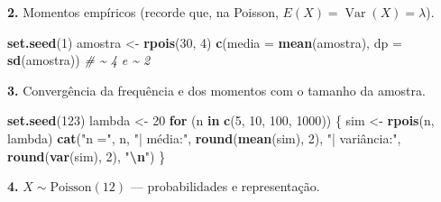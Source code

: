 \documentclass[
  portuguese,
  11pt,
  openany]{book}
\newenvironment{Shaded}{\begin{snugshade}}{\end{snugshade}}
\newcommand{\AttributeTok}[1]{\textcolor[rgb]{0.13,0.29,0.53}{#1}}
\newcommand{\CommentTok}[1]{\textcolor[rgb]{0.56,0.35,0.01}{\textit{#1}}}
\newcommand{\ControlFlowTok}[1]{\textcolor[rgb]{0.13,0.29,0.53}{\textbf{#1}}}
\newcommand{\DecValTok}[1]{\textcolor[rgb]{0.00,0.00,0.81}{#1}}
\newcommand{\FunctionTok}[1]{\textcolor[rgb]{0.13,0.29,0.53}{\textbf{#1}}}
\newcommand{\NormalTok}[1]{#1}
\newcommand{\OtherTok}[1]{\textcolor[rgb]{0.56,0.35,0.01}{#1}}
\newcommand{\SpecialCharTok}[1]{\textcolor[rgb]{0.81,0.36,0.00}{\textbf{#1}}}
\newcommand{\StringTok}[1]{\textcolor[rgb]{0.31,0.60,0.02}{#1}}
\begin{document}
\textbf{2.} Momentos empíricos (recorde que, na Poisson, \(E(X) = \operatorname{Var}(X) = \lambda\)).

\begin{Shaded}
\begin{Highlighting}[]
\FunctionTok{set.seed}\NormalTok{(}\DecValTok{1}\NormalTok{)}
\NormalTok{amostra }\OtherTok{\textless{}{-}} \FunctionTok{rpois}\NormalTok{(}\DecValTok{30}\NormalTok{, }\DecValTok{4}\NormalTok{)}
\FunctionTok{c}\NormalTok{(}\AttributeTok{media =} \FunctionTok{mean}\NormalTok{(amostra), }\AttributeTok{dp =} \FunctionTok{sd}\NormalTok{(amostra))   }\CommentTok{\# \textasciitilde{} 4 e \textasciitilde{} 2}
\end{Highlighting}
\end{Shaded}

\textbf{3.} Convergência da frequência e dos momentos com o tamanho da amostra.

\begin{Shaded}
\begin{Highlighting}[]
\FunctionTok{set.seed}\NormalTok{(}\DecValTok{123}\NormalTok{)}
\NormalTok{lambda }\OtherTok{\textless{}{-}} \DecValTok{20}
\ControlFlowTok{for}\NormalTok{ (n }\ControlFlowTok{in} \FunctionTok{c}\NormalTok{(}\DecValTok{5}\NormalTok{, }\DecValTok{10}\NormalTok{, }\DecValTok{100}\NormalTok{, }\DecValTok{1000}\NormalTok{)) \{}
\NormalTok{  sim }\OtherTok{\textless{}{-}} \FunctionTok{rpois}\NormalTok{(n, lambda)}
  \FunctionTok{cat}\NormalTok{(}\StringTok{"n ="}\NormalTok{, n, }\StringTok{"| média:"}\NormalTok{, }\FunctionTok{round}\NormalTok{(}\FunctionTok{mean}\NormalTok{(sim), }\DecValTok{2}\NormalTok{),}
      \StringTok{"| variância:"}\NormalTok{, }\FunctionTok{round}\NormalTok{(}\FunctionTok{var}\NormalTok{(sim), }\DecValTok{2}\NormalTok{), }\StringTok{"}\SpecialCharTok{\textbackslash{}n}\StringTok{"}\NormalTok{)}
\NormalTok{\}}
\end{Highlighting}
\end{Shaded}

\textbf{4.} \(X \sim \text{Poisson}(12)\) --- probabilidades e representação.
\end{document}
